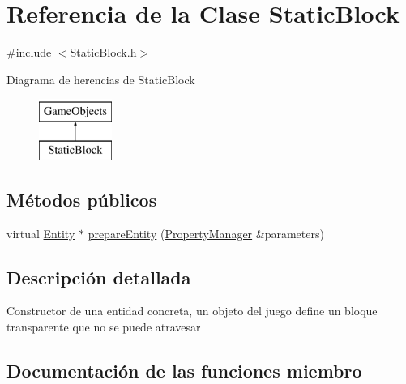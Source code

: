 \hypertarget{classStaticBlock}{}\section{Referencia de la Clase Static\+Block}
\label{classStaticBlock}


{\ttfamily \#include $<$Static\+Block.\+h$>$}

Diagrama de herencias de Static\+Block\begin{figure}[H]
\begin{center}
\leavevmode
\includegraphics[height=2.000000cm]{classStaticBlock}
\end{center}
\end{figure}
\subsection*{Métodos públicos}
\begin{DoxyCompactItemize}
\item 
virtual \hyperlink{classEntity}{Entity} $\ast$ \hyperlink{classStaticBlock_a4443eba7de18fb6ee06fe40630ec22b8}{prepare\+Entity} (\hyperlink{classPropertyManager}{Property\+Manager} \&parameters)
\end{DoxyCompactItemize}


\subsection{Descripción detallada}
Constructor de una entidad concreta, un objeto del juego define un bloque transparente que no se puede atravesar 

\subsection{Documentación de las funciones miembro}
\hypertarget{classStaticBlock_a4443eba7de18fb6ee06fe40630ec22b8}{}
